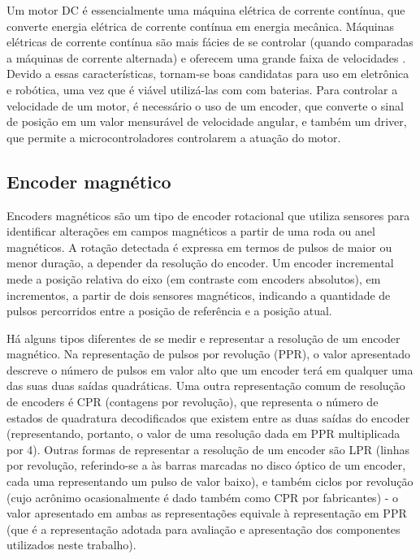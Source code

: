 
Um motor DC é essencialmente uma máquina elétrica de corrente contínua, que
converte energia elétrica de corrente contínua em energia mecânica. Máquinas
elétricas de corrente contínua são mais fácies de se controlar (quando
comparadas a máquinas de corrente alternada) e oferecem uma grande faixa de
velocidades \cite{Maquinas_eletricas}. Devido a essas características, tornam-se
boas candidatas para uso em eletrônica e robótica, uma vez que é viável
utilizá-las com com baterias. Para controlar a velocidade de um motor, é
necessário o uso de um encoder, que converte o sinal de posição em um valor
mensurável de velocidade angular, e também um driver, que permite a
microcontroladores controlarem a atuação do motor.

\subsection{Encoder magnético}

	Encoders magnéticos são um tipo de encoder rotacional que utiliza sensores 
	para identificar alterações em campos magnéticos a partir de uma roda ou 
	anel magnéticos. A rotação detectada é expressa em termos de pulsos de maior
	ou menor duração, a depender da resolução do encoder. Um encoder incremental
	mede a posição relativa do eixo (em contraste com encoders absolutos), em
	incrementos, a partir de dois sensores magnéticos, indicando a quantidade de
	pulsos percorridos entre a posição de referência e a posição atual.
	
	Há alguns tipos diferentes de se medir e representar a resolução de um
	encoder magnético. Na representação de pulsos por revolução (PPR), o valor 
	apresentado descreve o número de pulsos em valor alto que um encoder terá em
	qualquer uma das suas duas saídas quadráticas. Uma outra representação comum
	de resolução de encoders é CPR (contagens por revolução), que representa o
	número de estados de quadratura decodificados que existem entre as duas
	saídas do encoder (representando, portanto, o valor de uma resolução dada em
	PPR multiplicada por 4). Outras formas de representar a resolução de um
	encoder são LPR (linhas por revolução, referindo-se a às barras marcadas no
	disco óptico de um encoder, cada uma representando um pulso de valor baixo),
	e também ciclos por revolução (cujo acrônimo ocasionalmente é dado também
	como CPR por fabricantes) - o valor apresentado em ambas as representações 
	equivale à representação em PPR (que é a representação adotada para
	avaliação e apresentação dos componentes utilizados neste trabalho). 
	
